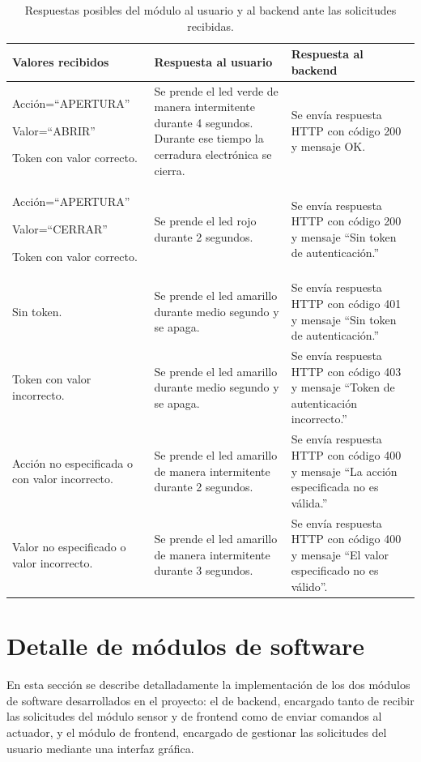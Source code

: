 \begin{table}[h]
	\centering
	\caption[Respuestas backend ]{Respuestas posibles del módulo al usuario y al backend ante las solicitudes recibidas.}
	\begin{tabular}{p{4cm} p{4.5cm} p{4.5cm} } 	

		\toprule
		\textbf{Valores recibidos} & 
		\textbf{Respuesta al usuario} &
		\textbf{Respuesta al backend} 
		\\
		\midrule

Acción=``APERTURA''

Valor=``ABRIR''

Token con valor correcto.& Se prende el led verde de manera intermitente durante 4 segundos. Durante ese tiempo la cerradura electrónica se cierra. & Se envía respuesta HTTP con código 200 y mensaje OK. \\
Acción=``APERTURA''

Valor=``CERRAR''

Token con valor correcto. & Se prende el led rojo durante 2 segundos. & Se envía respuesta HTTP con código 200 y mensaje ``Sin token de autenticación.'' \\
Sin token. & Se prende el led amarillo  durante medio segundo y se apaga. & Se envía respuesta HTTP con código 401 y mensaje ``Sin token de autenticación.'' \\
Token con valor incorrecto. & Se prende el led amarillo  durante medio segundo y se apaga. & Se envía respuesta HTTP con código 403 y mensaje ``Token de autenticación incorrecto.'' \\
Acción no especificada o con valor incorrecto. & Se prende el led amarillo de manera intermitente durante 2 segundos. & Se envía respuesta HTTP con código 400 y mensaje ``La acción especificada no es válida.'' \\
Valor no especificado o valor incorrecto. & Se prende el led amarillo de manera intermitente durante 3 segundos. & Se envía respuesta HTTP con código 400 y mensaje ``El valor especificado no es válido''. \\
		\bottomrule
		\hline
	\end{tabular}
	\label{tab:respuestasActuadorBackend}
\end{table}

\pagebreak
\section{Detalle de módulos de software}

En esta sección se describe detalladamente la implementación de los dos módulos de software desarrollados en el proyecto: el de backend, encargado tanto de recibir las solicitudes del módulo sensor y de frontend como de enviar comandos al actuador, y el módulo de frontend, encargado de gestionar las solicitudes del usuario mediante una interfaz gráfica.

